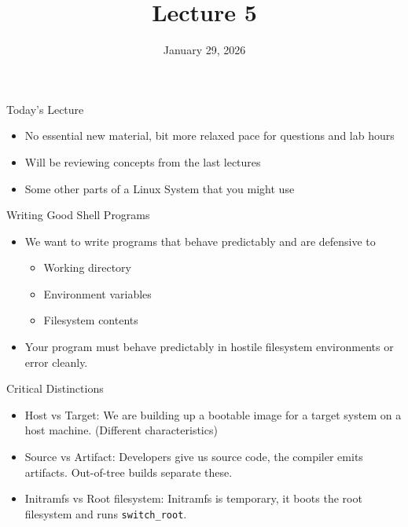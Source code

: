 \documentclass{../lecture}
\title{Lecture 5}
\date{January 29, 2026}
\begin{document}
\maketitle

\begin{frame}{Today's Lecture}
  \begin{itemize}
    \item No essential new material, bit more relaxed pace for questions and lab
      hours
    \item Will be reviewing concepts from the last lectures
    \item Some other parts of a Linux System that you might use
  \end{itemize}
\end{frame}

\begin{frame}{Writing Good Shell Programs}
  \begin{itemize}
    \item We want to write programs that behave predictably and are defensive to
      \begin{itemize}
        \item Working directory
        \item Environment variables
        \item Filesystem contents
      \end{itemize}
    \item Your program must behave predictably in hostile filesystem
      environments or error cleanly.
  \end{itemize}
\end{frame}

\begin{frame}{Critical Distinctions}
  \begin{itemize}
    \item Host vs Target: We are building up a bootable image for a target
      system on a host machine. (Different characteristics)
    \item Source vs Artifact: Developers give us source code, the compiler emits
      artifacts. Out-of-tree builds separate these.
    \item Initramfs vs Root filesystem: Initramfs is temporary, it boots the
      root filesystem and runs \texttt{switch\_root}.
  \end{itemize}
\end{frame}
\end{document}

